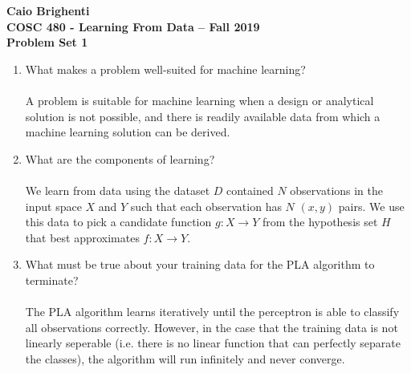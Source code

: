 \documentclass{article}
\begin{document}
\noindent \textbf{Caio Brighenti }\\
\noindent \textbf{COSC 480 - Learning From Data -- Fall 2019}\\%
\noindent \textbf{Problem Set 1}\vspace{1em}\\
\begin{enumerate}
	\item What makes a problem well-suited for machine learning?
	\\\\ A problem is suitable for machine learning when a design or analytical solution is not possible, and there is readily available data from which a machine learning solution can be derived. 
	\item What are the components of learning?
	\\\\ We learn from data using the dataset $D$ contained $N$ observations in the input space $X$ and $Y$ such that each observation has $N$ $(x,y)$ pairs. We use this data to pick a candidate function $g: X \rightarrow Y$ from the hypothesis set $H$ that best approximates $f: X \rightarrow Y$. 
	\item What must be true about your training data for the PLA algorithm to terminate?
	\\\\ The PLA algorithm learns iteratively until the perceptron is able to classify all observations correctly. However, in the case that the training data is not linearly seperable (i.e. there is no linear function that can perfectly separate the classes), the algorithm will run infinitely and never converge.
\end{enumerate}
	
\end{document}
